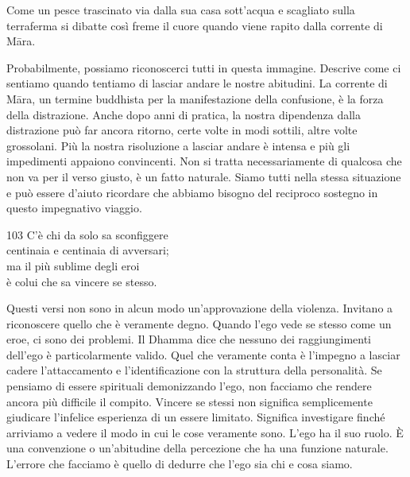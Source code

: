 
\begin{dhpVerse}{34}
\label{dhp-34}
Come un pesce trascinato via
dalla sua casa sott'acqua
e scagliato sulla terraferma
si dibatte
così freme il cuore
quando viene rapito
dalla corrente di Māra.
\end{dhpVerse}

\begin{dhpRefl}
Probabilmente, possiamo riconoscerci tutti in questa immagine. Descrive come ci sentiamo quando tentiamo di lasciar andare le nostre abitudini. La corrente di Māra, un termine buddhista per la manifestazione della confusione, \`{e} la forza della distrazione. Anche dopo anni di pratica, la nostra dipendenza dalla distrazione pu\`{o} far ancora ritorno, certe volte in modi sottili, altre volte grossolani. Più la nostra risoluzione a lasciar andare \`{e} intensa e più gli impedimenti appaiono convincenti. Non si tratta necessariamente di qualcosa che non va per il verso giusto, \`{e} un fatto naturale. Siamo tutti nella stessa situazione e pu\`{o} essere d'aiuto ricordare che abbiamo bisogno del reciproco sostegno in questo impegnativo viaggio.
\end{dhpRefl}


\begin{dhpVerse}{103}
\label{dhp-103}
C'\`{e} chi da solo sa sconfiggere\\
centinaia e centinaia di avversari;\\
ma il più sublime degli eroi\\
\`{e} colui che sa vincere se stesso.
\end{dhpVerse}

\begin{dhpRefl}
Questi versi non sono in alcun modo un'approvazione della violenza. Invitano a riconoscere quello che \`{e} veramente degno. Quando l'ego vede se stesso come un eroe, ci sono dei problemi. Il Dhamma dice che nessuno dei raggiungimenti dell'ego \`{e} particolarmente valido. Quel che veramente conta \`{e} l'impegno a lasciar cadere l'attaccamento e l'identificazione con la struttura della personalit\`{a}. Se pensiamo di essere spirituali demonizzando l'ego, non facciamo che rendere ancora più difficile il compito. Vincere se stessi non significa semplicemente giudicare l'infelice esperienza di un essere limitato. Significa investigare finch\'{e} arriviamo a vedere il modo in cui le cose veramente sono. L'ego ha il suo ruolo. \`{E} una convenzione o un'abitudine della percezione che ha una funzione naturale. L'errore che facciamo \`{e} quello di dedurre che l'ego sia chi e cosa siamo.
\end{dhpRefl}

